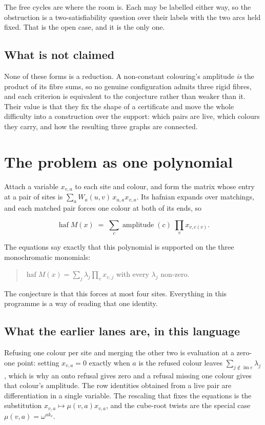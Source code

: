 \documentclass[11pt]{article}
\theoremstyle{definition}
\theoremstyle{remark}
\begin{document}
The free cycles are where the room is.  Each may be labelled either way, so the obstruction is a
two-satisfiability question over their labels with the two arcs held fixed.  That is the open case,
and it is the only one.

\subsection*{What is not claimed}

None of these forms is a reduction.  A non-constant colouring's amplitude \emph{is} the product of its
fibre sums, so no genuine configuration admits three rigid fibres, and each criterion is equivalent
to the conjecture rather than weaker than it.  Their value is that they fix the shape of a
certificate and move the whole difficulty into a construction over the support: which pairs are
live, which colours they carry, and how the resulting three graphs are connected.

\section{The problem as one polynomial}\label{sec:poly}

Attach a variable $x_{v,a}$ to each site and colour, and form the matrix whose entry at a pair of
sites is $\sum_a W_a(u,v)\,x_{u,a}x_{v,a}$.  Its hafnian expands over matchings, and each matched pair
forces one colour at both of its ends, so

\[
  \operatorname{haf} M(x)\;=\;\sum_{c} \operatorname{amplitude}(c)\;\prod_{v} x_{v,c(v)} .
\]

The equations say exactly that this polynomial is supported on the three monochromatic monomials:

\begin{quote}
$\operatorname{haf} M(x) = \sum_{j} \lambda_j \prod_v x_{v,j}$ with every $\lambda_j$ non-zero.
\end{quote}

The conjecture is that this forces at most four sites.  Everything in this programme is a way of
reading that one identity.

\subsection*{What the earlier lanes are, in this language}

Refusing one colour per site and merging the other two is evaluation at a zero-one point: setting
$x_{v,a}=0$ exactly when $a$ is the refused colour leaves $\sum_{j \notin \operatorname{im} e}
\lambda_j$, which is why an onto refusal gives zero and a refusal missing one colour gives that
colour's amplitude.  The row identities obtained from a live pair are differentiation in a single
variable.  The rescaling that fixes the equations is the substitution $x_{v,a} \mapsto \mu(v,a)
x_{v,a}$, and the cube-root twists are the special case $\mu(v,a) = \omega^{a k_v}$.
\end{document}
